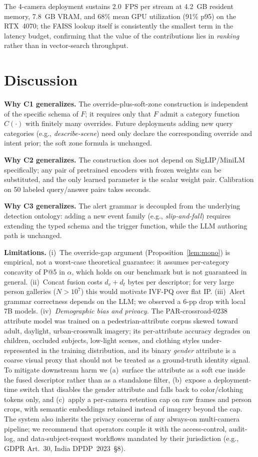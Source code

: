 ﻿\documentclass[conference]{IEEEtran}
\theoremstyle{definition}
\begin{document}
The 4-camera deployment sustains 2.0~FPS per stream at 4.2~GB resident memory, 7.8~GB VRAM, and 68\% mean GPU utilization (91\% p95) on the RTX~4070; the FAISS lookup itself is consistently the smallest term in the latency budget, confirming that the value of the contributions lies in \emph{ranking} rather than in vector-search throughput.

\section{Discussion}

\textbf{Why C1 generalizes.} The override-plus-soft-zone construction is independent of the specific schema of $F$; it requires only that $F$ admit a category function $C(\cdot)$ with finitely many overrides. Future deployments adding new query categories (e.g., \emph{describe-scene}) need only declare the corresponding override and intent prior; the soft zone formula is unchanged.

\textbf{Why C2 generalizes.} The construction does not depend on SigLIP/MiniLM specifically; any pair of pretrained encoders with frozen weights can be substituted, and the only learned parameter is the scalar weight pair. Calibration on 50 labeled query/answer pairs takes seconds.

\textbf{Why C3 generalizes.} The alert grammar is decoupled from the underlying detection ontology: adding a new event family (e.g., \emph{slip-and-fall}) requires extending the typed schema and the trigger function, while the LLM authoring path is unchanged.

\textbf{Limitations.} (i)~The override-gap argument (Proposition~\ref{lem:mono}) is empirical, not a worst-case theoretical guarantee: it assumes per-category concavity of P@5 in $\alpha$, which holds on our benchmark but is not guaranteed in general. (ii)~Concat fusion costs $d_v+d_t$ bytes per descriptor; for very large person galleries ($N>10^7$) this would motivate IVF-PQ over flat IP. (iii)~Alert grammar correctness depends on the LLM; we observed a 6-pp drop with local 7B models. (iv)~\emph{Demographic bias and privacy.} The PAR-crossroad-0238 attribute model was trained on a pedestrian-attribute corpus skewed toward adult, daylight, urban-crosswalk imagery; its per-attribute accuracy degrades on children, occluded subjects, low-light scenes, and clothing styles under-represented in the training distribution, and its binary \textit{gender} attribute is a coarse visual proxy that should not be treated as a ground-truth identity signal. To mitigate downstream harm we (a)~surface the attribute as a soft cue inside the fused descriptor rather than as a standalone filter, (b)~expose a deployment-time switch that disables the gender attribute and falls back to color/clothing tokens only, and (c)~apply a per-camera retention cap on raw frames and person crops, with semantic embeddings retained instead of imagery beyond the cap. The system also inherits the privacy concerns of any always-on multi-camera pipeline; we recommend that operators couple it with the access-control, audit-log, and data-subject-request workflows mandated by their jurisdiction (e.g., GDPR Art.~30, India DPDP~2023~\S8).
\end{document}
